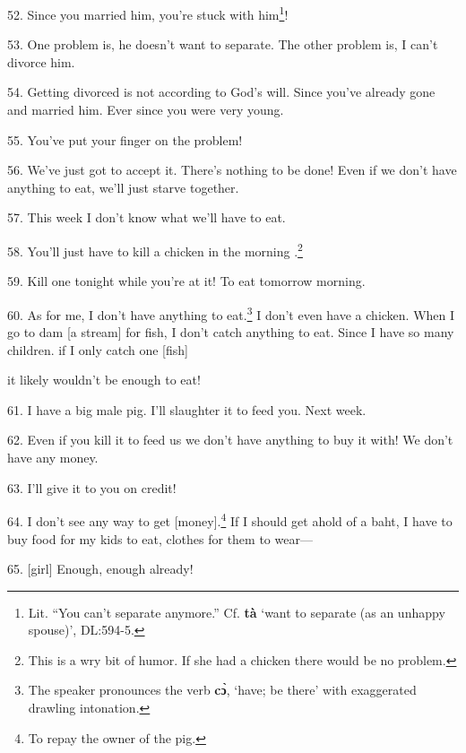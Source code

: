 52. Since you married him, you're stuck with him\footnote{Lit. ``You can't separate anymore.'' Cf. \textbf{tà} `want to separate (as an unhappy spouse)', DL:594-5.}!

53. One problem is, he doesn't want to separate. The other problem is, I can't
divorce him.

54. Getting divorced is not according to God's will. Since you've already gone
and married him. Ever since you were very young.

55. You've put your finger on the problem!

56. We've just got to accept it. There's nothing to be done! Even if we don't have
anything to eat, we'll just starve together.

57. This week I don't know what we'll have to eat.

58.  You'll just have to kill a chicken in the morning
.\footnote{This is a wry bit of humor. If she had a chicken there would be no problem.}

59. Kill one tonight while you're at it! To eat tomorrow morning.

60. As for me, I don't have anything to eat.\footnote{The speaker pronounces the verb \textbf{cɔ̀}, `have; be there' with exaggerated drawling intonation.} I don't even have a chicken.
When I go to dam [a stream] for fish, I don't catch anything to eat. Since I have
so many children. if I only catch one [fish]

it likely wouldn't be enough to eat!

61. I have a big male pig. I'll slaughter it to feed you. Next week.

62. Even if you kill it to feed us we don't have anything to buy it with! We don't
have any money.

63. I'll give it to you on credit!

64. I don't see any way to get [money].\footnote{To repay the owner of the pig.} If I should get ahold of a baht, I
have to buy food for my kids to eat, clothes for them to wear---

65. [girl] Enough, enough already! 

